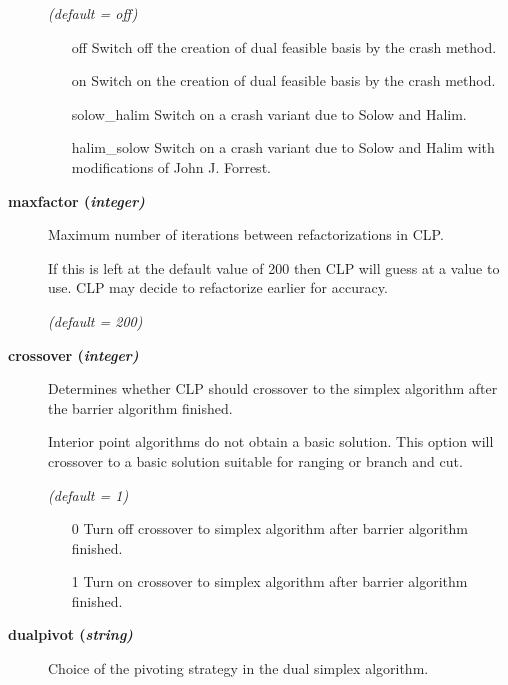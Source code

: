 \begin{description}
\textsl{(default = off)}
\begin{itemize}
\item[off] 
Switch off the creation of dual feasible basis by the crash method.
\item[on] 
Switch on the creation of dual feasible basis by the crash method.
\item[solow\_halim] 
Switch on a crash variant due to Solow and Halim.
\item[halim\_solow] 
Switch on a crash variant due to Solow and Halim with modifications of John J. Forrest.
\end{itemize}

\item[\label{maxfactor}\hypertarget{maxfactor}
{\textbf{maxfactor (\slshape{integer})}}]\hspace{1.0in}

Maximum number of iterations between refactorizations in CLP.

If this is left at the default value of 200 then CLP will guess at a value to use.
CLP may decide to refactorize earlier for accuracy.

\textsl{(default = 200)}

\item[\label{crossover}\hypertarget{crossover}
{\textbf{crossover (\slshape{integer})}}]\hspace{1.0in}

Determines whether CLP should crossover to the simplex algorithm after the barrier algorithm finished.

Interior point algorithms do not obtain a basic solution.
This option will crossover to a basic solution suitable for ranging or branch and cut.

\textsl{(default = 1)}
\begin{itemize}
\item[0] 
Turn off crossover to simplex algorithm after barrier algorithm finished.
\item[1] 
Turn on crossover to simplex algorithm after barrier algorithm finished.
\end{itemize}

\item[\label{dualpivot}\hypertarget{dualpivot}
{\textbf{dualpivot (\slshape{string})}}]\hspace{1.0in}

Choice of the pivoting strategy in the dual simplex algorithm.


\end{description}
